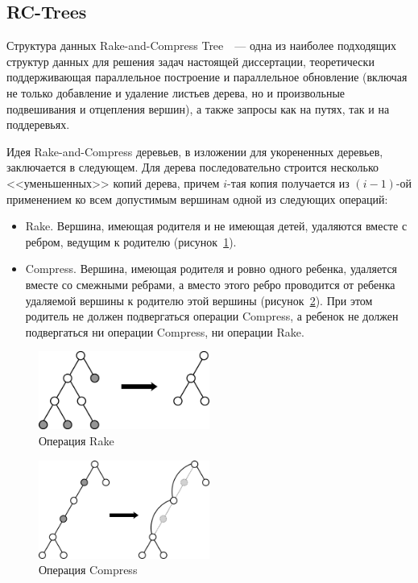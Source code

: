 \documentclass[specification,annotation]{itmo-student-thesis}
\begin{document}
\subsection{RC-Trees}

Структура данных Rake-and-Compress Tree~\cite{reif94}~--- одна из наиболее подходящих структур данных для решения задач настоящей диссертации,
теоретически поддерживающая параллельное построение и параллельное обновление (включая не только добавление и удаление листьев дерева, но и произвольные
подвешивания и отцепления вершин), а также запросы как на путях, так и на поддеревьях.

Идея Rake-and-Compress деревьев, в изложении для укорененных деревьев, заключается в следующем. Для дерева последовательно строится несколько <<уменьшенных>> копий дерева, причем $i$-тая копия получается
из $(i-1)$-ой применением ко всем допустимым вершинам одной из следующих операций:
\begin{itemize}
    \item Rake. Вершина, имеющая родителя и не имеющая детей, удаляются вместе с ребром, ведущим к родителю (рисунок~\ref{fig:rake}).
    \item Compress. Вершина, имеющая родителя и ровно одного ребенка, удаляется вместе со смежными ребрами, а вместо этого ребро проводится от ребенка удаляемой вершины к родителю этой вершины
          (рисунок~\ref{fig:compress}). При этом родитель не должен подвергаться операции Compress, а ребенок не должен подвергаться ни операции Compress, ни операции Rake.
\end{itemize}

\begin{figure}[!ht]
\centering
\includegraphics[width=0.5\textwidth]{pic/rake.png}
\caption{Операция Rake}\label{fig:rake}
\end{figure}
\begin{figure}[!ht]
\centering
\includegraphics[width=0.5\textwidth]{pic/compress.png}
\caption{Операция Compress}\label{fig:compress}
\end{figure}
\end{document}
